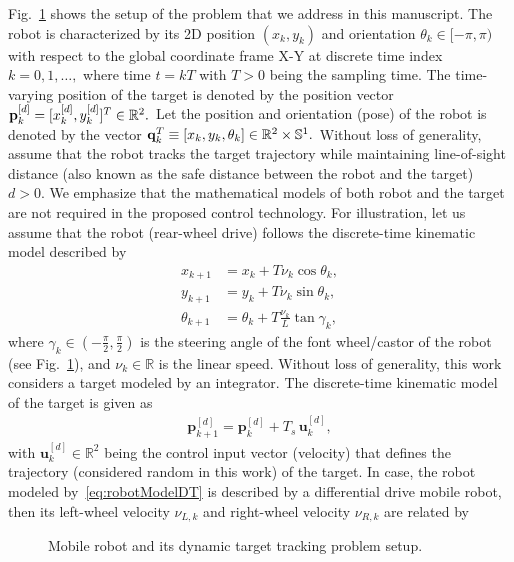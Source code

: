 \documentclass[conference]{IEEEtran}
\begin{document}
Fig.~\ref{fig:leaderFollowerSetup} shows the setup of the problem that we address in this manuscript. The robot is characterized by its 2D position $(x_k,y_k)$ and orientation $\theta_k\in[-\pi,\pi)$ with respect to the global coordinate frame X-Y at discrete time index $k=0,1,\ldots,$ where time $t=kT$ with $T>0$ being the sampling time. The time-varying position of the target is denoted by the position vector ${\bf p}_k^{[d]}= [x_k^{[d]},y_k^{[d]}]^T\in\mathbb{R}^2.$  Let the position and orientation (pose) of the robot is denoted by the vector  ${\bf q}_k^T\equiv[x_k,y_k,\theta_k]\in\mathbb{R}^2\times\mathbb{S}^1.$ Without loss of generality, assume that the robot tracks the target trajectory while maintaining line-of-sight distance (also known as the safe distance between the robot and the target) $d>0.$ We emphasize that the mathematical models of both robot and the target are not required in the proposed control technology. For illustration, let us assume that the robot (rear-wheel drive) follows the discrete-time kinematic model described by %
%
\begin{subequations}
  \label{eq:robotModelDT}  
  \begin{align}
    x_{k+1} &= x_k +T\nu_k\cos\theta_k,\\
    y_{k+1} &= y_k +T\nu_k\sin\theta_k,\\
    \theta_{k+1} &= \theta_k + T\frac{\nu_k}{L}\tan\gamma_k,
  \end{align}
\end{subequations}
%
where $\gamma_k\in(-\frac{\pi}{2},\frac{\pi}{2})$ is the steering angle of the font wheel/castor of the robot (see Fig.~\ref{fig:leaderFollowerSetup}), and $\nu_k\in\mathbb{R}$ is the linear speed. Without loss of generality, this work considers a target modeled by an integrator. The discrete-time kinematic model of the target is given as %
%
 \begin{align}
   \label{eq:leaderDT}
   \mathbf{p}_{k+1}^{[d]} = \mathbf{p}_k^{[d]} + T_s \, \mathbf{u}_k^{[d]},
 \end{align}
% 
 with $\mathbf{u}_k^{[d]}\in\mathbb{R}^2$ being the control input vector (velocity) that defines the trajectory (considered random in this work) of the target.  In case, the robot modeled by~\eqref{eq:robotModelDT} is described by a differential drive mobile robot, then its left-wheel velocity $\nu_{L,k}$ and right-wheel velocity $\nu_{R,k}$ are related by
  \begin{figure}
   \centering
   \caption{Mobile robot and its dynamic target tracking problem setup.}
   \label{fig:leaderFollowerSetup}
 \end{figure}
\end{document}

